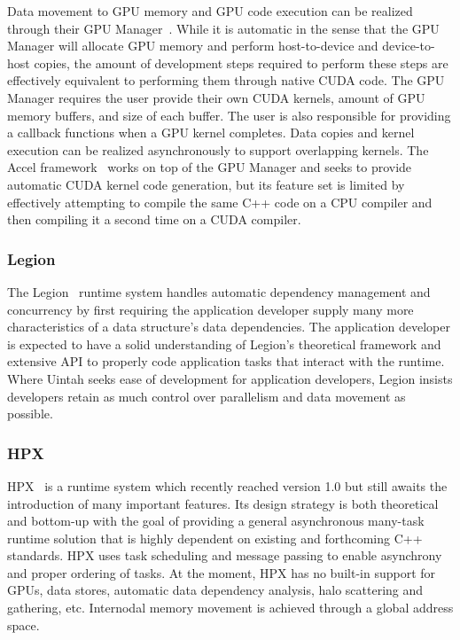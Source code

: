\documentclass[12pt]{article}
\begin{document}
Data movement to GPU memory and GPU code execution can be realized through their GPU Manager~\cite{charmpp-masters-gpumanager}.   While it is automatic in the sense that the GPU Manager will allocate GPU memory and perform host-to-device and device-to-host copies, the amount of development steps required to perform these steps are effectively equivalent to performing them through native CUDA code.  The GPU Manager requires the user provide their own CUDA kernels, amount of GPU memory buffers, and size of each buffer.  The user is also responsible for providing a callback functions when a GPU kernel completes.   Data copies and kernel execution can be realized asynchronously to support overlapping kernels.  The Accel framework~\cite{charmpp-thesis-accel} works on top of the GPU Manager and seeks to provide automatic CUDA kernel code generation, but its feature set is limited by effectively attempting to compile the same C++ code on a CPU compiler and then compiling it a second time on a CUDA compiler.

\subsubsection{Legion}
\label{ch:legion}
The Legion~\cite{legion2012} runtime system handles automatic dependency management and concurrency by first requiring the application developer supply many more characteristics of a data structure’s data dependencies.  The application developer is expected to have a solid understanding of Legion’s theoretical framework and extensive API to properly code application tasks that interact with the runtime.  Where Uintah seeks ease of development for application developers, Legion insists developers retain as much control over parallelism and data movement as possible.  

\subsubsection{HPX}
\label{ch:hpx}
HPX~\cite{HPX-scaling-global-address-space} is a runtime system which recently reached version 1.0 but still awaits the introduction of many important features.  Its design strategy is both theoretical and bottom-up with the goal of providing a general asynchronous many-task runtime solution that is highly dependent on existing and forthcoming C++ standards.   HPX uses task scheduling and message passing to enable asynchrony and proper ordering of tasks.  At the moment, HPX has no built-in support for GPUs, data stores, automatic data dependency analysis, halo scattering and gathering, etc.   Internodal memory movement is achieved through a global address space.
\end{document}
